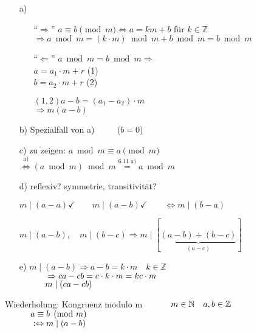 \documentclass[a4paper, 12pt, twoside] {article}
\begin{document}
\begin{itemize}

\item[a)] \begin{itemize}

\item["`$\Rightarrow$"'] $ a \equiv b \pmod m \Leftrightarrow a = k m + b$ für $k \in \mathbb{Z}$ \\
$\Rightarrow a \bmod m = (k  \cdot  m) \bmod m + b \bmod m = b \bmod m$

\item["`$\Leftarrow$"'] $a \bmod m = b \bmod m \Rightarrow$ \\
$a = a_1 \cdot m + r$ (1) \\
$b = a_2 \cdot m + r$ (2) \/

$(1, 2) a -b = (a_1 - a_2) \cdot m$ \\
$\Rightarrow m(a -b)$

\end{itemize}

\item[b)] Spezialfall von a) $\qquad$ ($b=0$)


\item[c)] zu zeigen: $a \bmod m \equiv a \pmod m$ \\
$\overset{\text{a)}}{\Leftrightarrow} (a \bmod m) \bmod m \overset{\text{6.11 a)}}{=} a \bmod m$

\item[d)] reflexiv? symmetrie, transitivität?

$m \mid (a-a) \checkmark \qquad m \mid (a-b) \checkmark \qquad \Leftrightarrow m \mid (b-a)$ 

$m \mid (a-b), \quad m \mid (b-c) \Rightarrow m \mid [\underbrace{(a-b)+(b-c)}_{(a-c)}]$

\item[e)] $m \mid (a-b) \Rightarrow a-b = k \cdot m \quad k \in \mathbb{Z}$ \\
$\text{\qquad \quad} \Rightarrow ca-cb = c \cdot k \cdot m = kc \cdot m$ \\
$\text{\qquad \quad} m \mid (ca-cb)$

\end{itemize}

Wiederholung: Kongruenz modulo m
$\text{\qquad \quad} m \in \mathbb{N} \quad a,b \in \mathbb{Z}$ \\
$\text{\qquad \quad} a \equiv b \pmod m$ \\
$\text{\qquad \quad} :\Leftrightarrow m \mid (a-b)$
\end{document}
